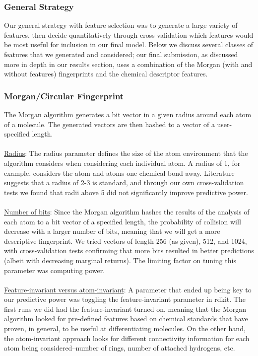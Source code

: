 \documentclass[11pt]{article}
\begin{document}
\subsubsection*{General Strategy}
Our general strategy with feature selection was to generate a large variety of features, then decide quantitatively through cross-validation which features would be most useful for inclusion in our final model. Below we discuss several classes of features that we generated and considered; our final submission, as discussed more in depth in our results section, uses a combination of the Morgan (with and without features) fingerprints and the chemical descriptor features.

\subsubsection*{Morgan/Circular Fingerprint}
The Morgan algorithm generates a bit vector in a given radius around each atom of a molecule. The generated vectors are then hashed to a vector of a user-specified length. \\ \\
\underline{Radius}: The radius parameter defines the size of the atom environment that the algorithm considers when considering each individual atom. A radius of 1, for example, considers the atom and atoms one chemical bond away. Literature suggests that a radius of 2-3 is standard, and through our own cross-validation tests we found that radii above 5 did not significantly improve predictive power. \\ \\
\underline{Number of bits}: Since the Morgan algorithm hashes the results of the analysis of each atom to a bit vector of a specified length, the probability of collision will decrease with a larger number of bits, meaning that we will get a more descriptive fingerprint. We tried vectors of length 256 (as given), 512, and 1024, with cross-validation tests confirming that more bits resulted in better predictions (albeit with decreasing marginal returns). The limiting factor on tuning this parameter was computing power. \\ \\
\underline{Feature-invariant versus atom-invariant}: A parameter that ended up being key to our predictive power was toggling the feature-invariant parameter in rdkit. The first runs we did had the feature-invariant turned on, meaning that the Morgan algorithm looked for pre-defined features based on chemical standards that have proven, in general, to be useful at differentiating molecules. On the other hand, the atom-invariant approach looks for different connectivity information for each atom being considered--number of rings, number of attached hydrogens, etc. \\ \\
\end{document}
